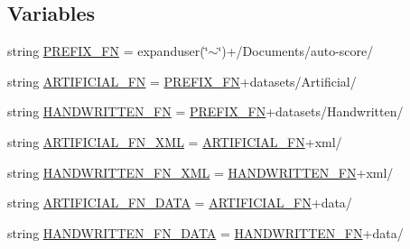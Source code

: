 \subsection*{Variables}
\begin{DoxyCompactItemize}
\item 
string \hyperlink{namespaceautoscore_1_1musicdata_a684ad72261f10358480f889b7c755716}{P\+R\+E\+F\+I\+X\+\_\+\+FN} = expanduser(\char`\"{}$\sim$\char`\"{})+\textquotesingle{}/Documents/auto-\/score/\textquotesingle{}
\item 
string \hyperlink{namespaceautoscore_1_1musicdata_acfb5d195ffef1d88681f6e3555219925}{A\+R\+T\+I\+F\+I\+C\+I\+A\+L\+\_\+\+FN} = \hyperlink{namespaceautoscore_1_1musicdata_a684ad72261f10358480f889b7c755716}{P\+R\+E\+F\+I\+X\+\_\+\+FN}+\textquotesingle{}datasets/Artificial/\textquotesingle{}
\item 
string \hyperlink{namespaceautoscore_1_1musicdata_af9a3c9c8a04c4a8459cff06c8d91a202}{H\+A\+N\+D\+W\+R\+I\+T\+T\+E\+N\+\_\+\+FN} = \hyperlink{namespaceautoscore_1_1musicdata_a684ad72261f10358480f889b7c755716}{P\+R\+E\+F\+I\+X\+\_\+\+FN}+\textquotesingle{}datasets/Handwritten/\textquotesingle{}
\item 
string \hyperlink{namespaceautoscore_1_1musicdata_a6e0e7fa09f8f4907ed2774f39c417c8d}{A\+R\+T\+I\+F\+I\+C\+I\+A\+L\+\_\+\+F\+N\+\_\+\+X\+ML} = \hyperlink{namespaceautoscore_1_1musicdata_acfb5d195ffef1d88681f6e3555219925}{A\+R\+T\+I\+F\+I\+C\+I\+A\+L\+\_\+\+FN}+\textquotesingle{}xml/\textquotesingle{}
\item 
string \hyperlink{namespaceautoscore_1_1musicdata_a10c11cab7fc783ad0b9185fc95581f59}{H\+A\+N\+D\+W\+R\+I\+T\+T\+E\+N\+\_\+\+F\+N\+\_\+\+X\+ML} = \hyperlink{namespaceautoscore_1_1musicdata_af9a3c9c8a04c4a8459cff06c8d91a202}{H\+A\+N\+D\+W\+R\+I\+T\+T\+E\+N\+\_\+\+FN}+\textquotesingle{}xml/\textquotesingle{}
\item 
string \hyperlink{namespaceautoscore_1_1musicdata_a47cc3f7854416092969250879a8a0d7f}{A\+R\+T\+I\+F\+I\+C\+I\+A\+L\+\_\+\+F\+N\+\_\+\+D\+A\+TA} = \hyperlink{namespaceautoscore_1_1musicdata_acfb5d195ffef1d88681f6e3555219925}{A\+R\+T\+I\+F\+I\+C\+I\+A\+L\+\_\+\+FN}+\textquotesingle{}data/\textquotesingle{}
\item 
string \hyperlink{namespaceautoscore_1_1musicdata_a323dfa7bb6acca22309294f911611ce1}{H\+A\+N\+D\+W\+R\+I\+T\+T\+E\+N\+\_\+\+F\+N\+\_\+\+D\+A\+TA} = \hyperlink{namespaceautoscore_1_1musicdata_af9a3c9c8a04c4a8459cff06c8d91a202}{H\+A\+N\+D\+W\+R\+I\+T\+T\+E\+N\+\_\+\+FN}+\textquotesingle{}data/\textquotesingle{}

\end{DoxyCompactItemize}
